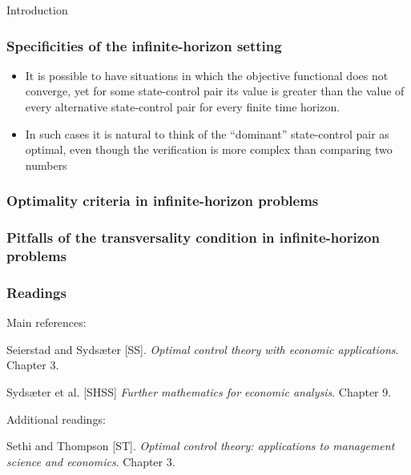 \documentclass[10pt]{beamer}
\theoremstyle{definition}
\begin{document}
\begin{section}{Introduction}
\begin{frame}[fragile]
\frametitle{Specificities of the infinite-horizon setting}
\begin{itemize}\itemsep1em
\item It is possible to have situations in which the objective functional does not converge, yet for some state-control pair its value is greater than the value of every alternative state-control pair for every finite time horizon.
\item In such cases it is natural to think of the ``dominant'' state-control pair as optimal, even though the verification is more complex than comparing two numbers
\end{itemize}
\end{frame}

\begin{frame}[fragile]
\frametitle{Optimality criteria in infinite-horizon problems}

\end{frame}

\begin{frame}[fragile]
\frametitle{Pitfalls of the transversality condition in infinite-horizon problems}

\end{frame}



\end{section}

\begin{frame}[fragile]
\frametitle{Readings}
Main references:\bigskip

Seierstad and Syds\ae{}ter [SS]. \emph{Optimal control theory with economic applications}. Chapter 3.

Syds\ae{}ter et al. [SHSS] \emph{Further mathematics for economic analysis}. Chapter 9.\bigskip

Additional readings:

Sethi and Thompson [ST]. \emph{Optimal control theory: applications to management science and economics}. Chapter 3.
\end{frame}
\end{document}
